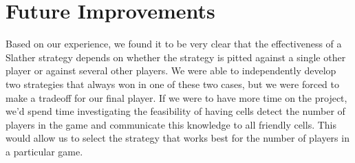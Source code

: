 \section{Future Improvements}
Based on our experience, we found it to be very clear that the effectiveness of a Slather strategy depends on whether the strategy is pitted against a single other player or against several other players. We were able to independently develop two strategies that always won in one of these two cases, but we were forced to make a tradeoff for our final player. If we were to have more time on the project, we’d spend time investigating the feasibility of having cells detect the number of players in the game and communicate this knowledge to all friendly cells. This would allow us to select the strategy that works best for the number of players in a particular game.